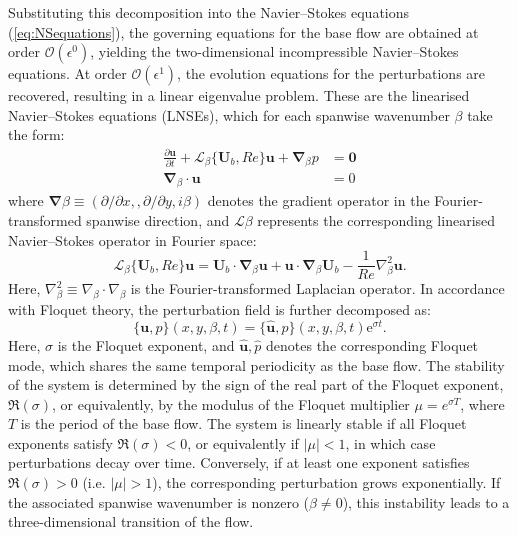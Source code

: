 Substituting this decomposition into the Navier–Stokes equations (\ref{eq:NSequations}), the governing equations for the base flow are obtained at order $\mathcal{O}(\epsilon^0)$, yielding the two-dimensional incompressible Navier–Stokes equations. At order $\mathcal{O}(\epsilon^1)$, the evolution equations for the perturbations are recovered, resulting in a linear eigenvalue problem. These are the linearised Navier–Stokes equations (LNSEs), which for each spanwise wavenumber $\beta$ take the form:
%
\begin{equation}
\begin{aligned}
\frac{\partial \bm{u}}{\partial t} + \mathcal{L}_\beta\{\bm{U}_b,Re\}\bm{u} + \bm{\nabla}_\beta p & = \bm{0} \\
\bm{\nabla}_\beta \cdot \bm{u} & = 0
\end{aligned}
\label{eq:LNSEs}
\end{equation}
%
where $\boldsymbol{\nabla}\beta \equiv \left( \partial / \partial x, , \partial / \partial y, i\beta \right)$ denotes the gradient operator in the Fourier-transformed spanwise direction, and $\mathcal{L}\beta$ represents the corresponding linearised Navier–Stokes operator in Fourier space:
%
\begin{equation}
\mathcal{L}_\beta\{\bm{U}_b,Re\}\bm{u}=\bm{U}_b \cdot \bm{\nabla}_\beta \bm{u} + \bm{u} \cdot \bm{\nabla}_\beta \bm{U}_b - \frac{1}{Re} \nabla^2_\beta \bm{u}.
\end{equation}
%
Here, $\nabla^2_\beta \equiv \nabla_\beta \cdot \nabla_\beta$ is the Fourier-transformed Laplacian operator. In accordance with Floquet theory, the perturbation field is further decomposed as:
%
\begin{equation}
\{\bm{u},p\}(x,y,\beta,t) = \{\hat{\bm{u}},\hat{p}\}(x,y,\beta,t) \text{e}^{\sigma t}.
\end{equation}
%
Here, $\sigma$ is the Floquet exponent, and ${\hat{\boldsymbol{u}}, \hat{p}}$ denotes the corresponding Floquet mode, which shares the same temporal periodicity as the base flow. The stability of the system is determined by the sign of the real part of the Floquet exponent, $\Re(\sigma)$, or equivalently, by the modulus of the Floquet multiplier $\mu = e^{\sigma T}$, where $T$ is the period of the base flow. The system is linearly stable if all Floquet exponents satisfy $\Re(\sigma) < 0$, or equivalently if $|\mu| < 1$, in which case perturbations decay over time. Conversely, if at least one exponent satisfies $\Re(\sigma) > 0$ (i.e. $|\mu| > 1$), the corresponding perturbation grows exponentially. If the associated spanwise wavenumber is nonzero ($\beta \neq 0$), this instability leads to a three-dimensional transition of the flow.

